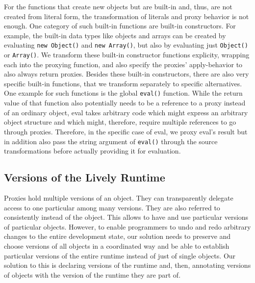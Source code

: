 For the functions that create new objects but are built-in and, thus, are not created from literal form, the transformation of literals and proxy behavior is not enough.
One category of such built-in functions are built-in constructors.
For example, the built-in data types like objects and arrays can be created by evaluating \lstinline{new Object()} and \lstinline{new Array()}, but also by evaluating just \lstinline{Object()} or \lstinline{Array()}.
We transform these built-in constructor functions explicity, wrapping each into the proxying function, and also specify the proxies' apply-behavior to also always return proxies.
Besides these built-in constructors, there are also very specific built-in functions, that we transform separately to specific alternatives.
One example for such functions is the global \lstinline{eval()} function.
While the return value of that function also potentially needs to be a reference to a proxy instead of an ordinary object, eval takes arbitrary code which might express an arbitrary object structure and which might, therefore, require multiple references to go through proxies.
Therefore, in the specific case of eval, we proxy eval's result but in addition also pass the string argument of \lstinline{eval()} through the source transformations before actually providing it for evaluation.


\subsection{Versions of the Lively Runtime} \label{subsec:APPROACH:2:3} %

Proxies hold multiple versions of an object.
They can transparently delegate access to one particular among many versions.
They are also referred to consistently instead of the object.
This allows to have and use particular versions of particular objects.
However, to enable programmers to undo and redo arbitrary changes to the entire development state, our solution needs to preserve and choose versions of all objects in a coordinated way and be able to establish particular versions of the entire runtime instead of just of single objects.
Our solution to this is declaring versions of the runtime and, then, annotating versions of objects with the version of the runtime they are part of.




